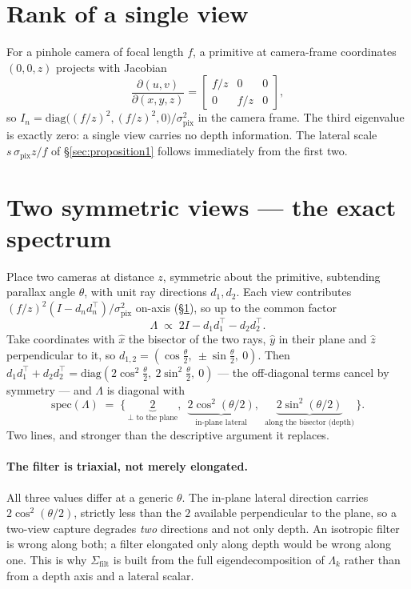 \section{Rank of a single view}
\label{app:rank}
For a pinhole camera of focal length $f$, a primitive at camera-frame
coordinates $(0,0,z)$ projects with Jacobian
\begin{equation}
  \frac{\partial(u,v)}{\partial(x,y,z)} =
  \begin{bmatrix} f/z & 0 & 0 \\ 0 & f/z & 0 \end{bmatrix},
\end{equation}
so $I_n = \mathrm{diag}\big((f/z)^2, (f/z)^2, 0\big)/\sigma_{\mathrm{pix}}^2$ in
the camera frame. The third eigenvalue is exactly zero: a single view carries no
depth information. The lateral scale $s\,\sigma_{\mathrm{pix}}z/f$ of
\S\ref{sec:proposition1} follows immediately from the first two.

\section{Two symmetric views --- the exact spectrum}
\label{app:twoview}
Place two cameras at distance $z$, symmetric about the primitive, subtending
parallax angle $\theta$, with unit ray directions $d_1, d_2$. Each view
contributes $(f/z)^2(I - d_nd_n^{\!\top})/\sigma_{\mathrm{pix}}^2$ on-axis
(\S\ref{app:rank}), so up to the common factor
\begin{equation}
  \Lambda \;\propto\; 2I - d_1d_1^{\!\top} - d_2d_2^{\!\top}.
\end{equation}
Take coordinates with $\hat x$ the bisector of the two rays, $\hat y$ in their
plane and $\hat z$ perpendicular to it, so
$d_{1,2} = (\cos\tfrac\theta2,\ \pm\sin\tfrac\theta2,\ 0)$. Then
$d_1d_1^{\!\top} + d_2d_2^{\!\top} = \mathrm{diag}(2\cos^2\tfrac\theta2,\
2\sin^2\tfrac\theta2,\ 0)$ --- the off-diagonal terms cancel by symmetry --- and
$\Lambda$ is diagonal with
\begin{equation}
  \mathrm{spec}(\Lambda) \;=\;
  \big\{\,\underbrace{2}_{\perp\text{ to the plane}},\ \
  \underbrace{2\cos^2(\theta/2)}_{\text{in-plane lateral}},\ \
  \underbrace{2\sin^2(\theta/2)}_{\text{along the bisector (depth)}}\,\big\}.
  \label{eq:twoviewspectrum}
\end{equation}
Two lines, and stronger than the descriptive argument it replaces.

\paragraph{The filter is triaxial, not merely elongated.} All three values differ
at a generic $\theta$. The in-plane lateral direction carries
$2\cos^2(\theta/2)$, strictly less than the $2$ available perpendicular to the
plane, so a two-view capture degrades \emph{two} directions and not only depth.
An isotropic filter is wrong along both; a filter elongated only along depth
would be wrong along one. This is why $\Sigma_{\mathrm{filt}}$ is built from the
full eigendecomposition of $\Lambda_k$ rather than from a depth axis and a
lateral scalar.

